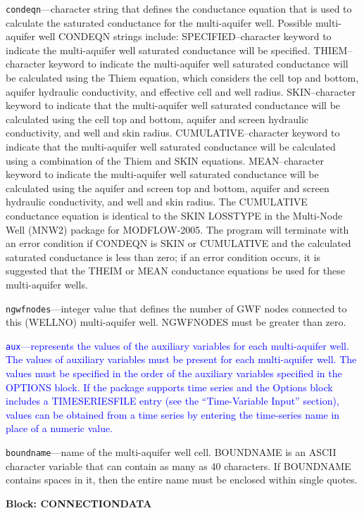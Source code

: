 \begin{description}
\item \texttt{condeqn}---character string that defines the conductance equation that is used to calculate the saturated conductance for the multi-aquifer well. Possible multi-aquifer well CONDEQN strings include: SPECIFIED--character keyword to indicate the multi-aquifer well saturated conductance will be specified.  THIEM--character keyword to indicate the multi-aquifer well saturated conductance will be calculated using the Thiem equation, which considers the cell top and bottom, aquifer hydraulic conductivity, and effective cell and well radius.  SKIN--character keyword to indicate that the multi-aquifer well saturated conductance will be calculated using the cell top and bottom, aquifer and screen hydraulic conductivity, and well and skin radius.  CUMULATIVE--character keyword to indicate that the multi-aquifer well saturated conductance will be calculated using a combination of the Thiem and SKIN equations.  MEAN--character keyword to indicate the multi-aquifer well saturated conductance will be calculated using the aquifer and screen top and bottom, aquifer and screen hydraulic conductivity, and well and skin radius. The CUMULATIVE conductance equation is identical to the SKIN LOSSTYPE in the Multi-Node Well (MNW2) package for MODFLOW-2005. The program will terminate with an error condition if CONDEQN is SKIN or CUMULATIVE and the calculated saturated conductance is less than zero; if an error condition occurs, it is suggested that the THEIM or MEAN conductance equations be used for these multi-aquifer wells.

\item \texttt{ngwfnodes}---integer value that defines the number of GWF nodes connected to this (WELLNO) multi-aquifer well. NGWFNODES must be greater than zero.

\item \textcolor{blue}{\texttt{aux}---represents the values of the auxiliary variables for each multi-aquifer well. The values of auxiliary variables must be present for each multi-aquifer well. The values must be specified in the order of the auxiliary variables specified in the OPTIONS block.  If the package supports time series and the Options block includes a TIMESERIESFILE entry (see the ``Time-Variable Input'' section), values can be obtained from a time series by entering the time-series name in place of a numeric value.}

\item \texttt{boundname}---name of the multi-aquifer well cell.  BOUNDNAME is an ASCII character variable that can contain as many as 40 characters.  If BOUNDNAME contains spaces in it, then the entire name must be enclosed within single quotes.

\end{description}
\item \textbf{Block: CONNECTIONDATA}

